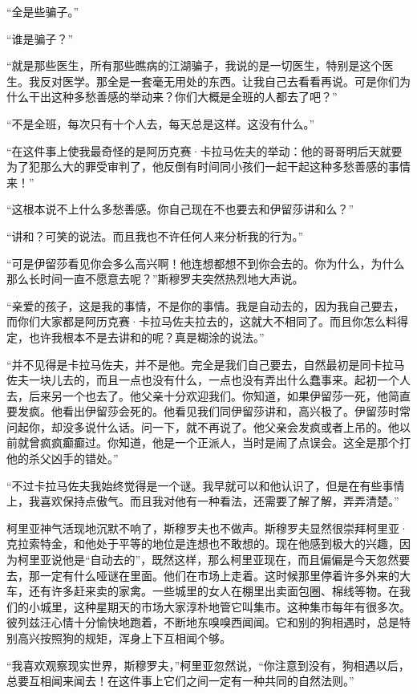 \par “全是些骗子。”
\par “谁是骗子？”
\par “就是那些医生，所有那些瞧病的江湖骗子，我说的是一切医生，特别是这个医生。我反对医学。那全是一套毫无用处的东西。让我自己去看看再说。可是你们为什么干出这种多愁善感的举动来？你们大概是全班的人都去了吧？”
\par “不是全班，每次只有十个人去，每天总是这样。这没有什么。”
\par “在这件事上使我最奇怪的是阿历克赛·卡拉马佐夫的举动：他的哥哥明后天就要为了犯那么大的罪受审判了，他反倒有时间同小孩们一起干起这种多愁善感的事情来！”
\par “这根本说不上什么多愁善感。你自己现在不也要去和伊留莎讲和么？”
\par “讲和？可笑的说法。而且我也不许任何人来分析我的行为。”
\par “可是伊留莎看见你会多么高兴啊！他连想都想不到你会去的。你为什么，为什么那么长时间一直不愿意去呢？”斯穆罗夫突然热烈地大声说。
\par “亲爱的孩子，这是我的事情，不是你的事情。我是自动去的，因为我自己要去，而你们大家都是阿历克赛·卡拉马佐夫拉去的，这就大不相同了。而且你怎么料得定，也许我根本不是去讲和的呢？真是糊涂的说法。”
\par “并不见得是卡拉马佐夫，并不是他。完全是我们自己要去，自然最初是同卡拉马佐夫一块儿去的，而且一点也没有什么，一点也没有弄出什么蠢事来。起初一个人去，后来另一个也去了。他父亲十分欢迎我们。你知道，如果伊留莎一死，他简直要发疯。他看出伊留莎会死的。他看见我们同伊留莎讲和，高兴极了。伊留莎时常问起你，却没多说什么话。问一下，就不再说了。他父亲会发疯或者上吊的。他以前就曾疯疯癫癫过。你知道，他是一个正派人，当时是闹了点误会。这全是那个打他的杀父凶手的错处。”
\par “不过卡拉马佐夫我始终觉得是一个谜。我早就可以和他认识了，但是在有些事情上，我喜欢保持点傲气。而且我对他有一种看法，还需要了解了解，弄弄清楚。”
\par 柯里亚神气活现地沉默不响了，斯穆罗夫也不做声。斯穆罗夫显然很崇拜柯里亚·克拉索特金，和他处于平等的地位是连想也不敢想的。现在他感到极大的兴趣，因为柯里亚说他是“自动去的”，既然这样，那么柯里亚现在，而且偏偏是今天忽然要去，那一定有什么哑谜在里面。他们在市场上走着。这时候那里停着许多外来的大车，还有许多赶来卖的家禽。一些城里的女人在棚里出卖面包圈、棉线等物。在我们的小城里，这种星期天的市场大家淳朴地管它叫集市。这种集市每年有很多次。彼列兹汪心情十分愉快地跑着，不断地东嗅嗅西闻闻。它和别的狗相遇时，总是特别高兴按照狗的规矩，浑身上下互相闻个够。
\par “我喜欢观察现实世界，斯穆罗夫，”柯里亚忽然说，“你注意到没有，狗相遇以后，总要互相闻来闻去！在这件事上它们之间一定有一种共同的自然法则。”
